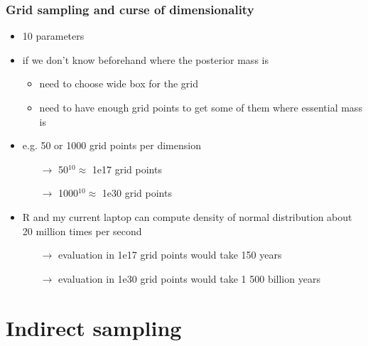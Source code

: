 \documentclass[10pt]{beamer}
\begin{document}
\begin{frame}
\frametitle{Grid sampling and curse of dimensionality}

  \begin{itemize}
      \item 10 parameters
      \item if we don't know beforehand where the posterior mass is
        \begin{itemize}
          \item need to choose wide box for the grid
          \item need to have enough grid points to get some of them
            where essential mass is
        \end{itemize}
      \item e.g. 50 or 1000 grid points per dimension
        \begin{itemize}
        \item[$\rightarrow$] 50$^{10} \approx$ 1e17 grid points
        \item[$\rightarrow$] 1000$^{10} \approx$ 1e30 grid points
        \end{itemize}
      \pause
      \item R and my current laptop can compute density of normal
        distribution about 20 million times per second
        \begin{itemize}
        \item[$\rightarrow$] evaluation in 1e17 grid points would take
           150 years %
        \item[$\rightarrow$] evaluation in 1e30 grid points would take
           1 500 billion years %
        \end{itemize}
 \end{itemize}

\end{frame}

\section{Indirect sampling}
\end{document}
